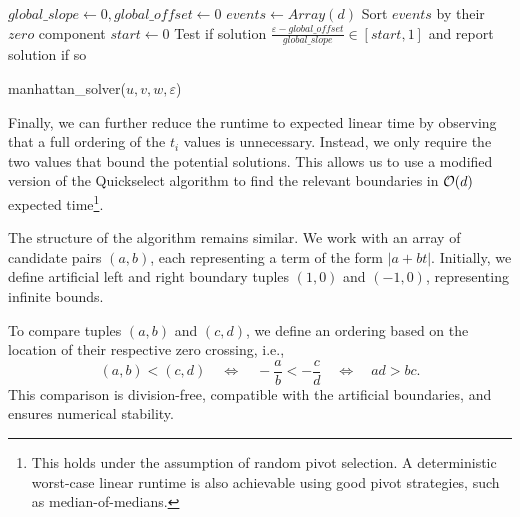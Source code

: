 \begin{algorithm}[ht]
  \DontPrintSemicolon
  \BlankLine
  \(global\_slope \gets 0, global\_offset \gets 0\) \;
  \(events \gets Array(d)\)
  Sort \(events\) by their \(zero\) component\;
  \(start \gets 0\)\;
  Test if solution \(\frac{\varepsilon - global\_offset}{global\_slope} \in [start, 1]\) and report solution if so\;

  \caption{manhattan\_solver(\(u, v, w, \varepsilon\))}
  \label{algo:solve_manhattan}
\end{algorithm}

Finally, we can further reduce the runtime to expected linear time by observing that a full ordering of the \(t_i\) values is unnecessary. Instead, we only require the two values that bound the potential solutions. This allows us to use a modified version of the Quickselect algorithm to find the relevant boundaries in \(\mathcal{O}(d)\) expected time\footnote{This holds under the assumption of random pivot selection. A deterministic worst-case linear runtime is also achievable using good pivot strategies, such as median-of-medians.}. 

The structure of the algorithm remains similar. We work with an array of candidate pairs \((a, b)\), each representing a term of the form \(|a+bt|\). Initially, we define artificial left and right boundary tuples \((1, 0)\) and \((-1, 0)\), representing infinite bounds. 

To compare tuples \((a, b)\) and \( (c,d)\), we define an ordering based on the location of their respective zero crossing, i.e.,
  \[(a, b) < (c, d) \quad \iff \quad -\frac{a}{b} < - \frac{c}{d} \quad \iff \quad ad > bc.\]
This comparison is division-free, compatible with the artificial boundaries, and ensures numerical stability.  

